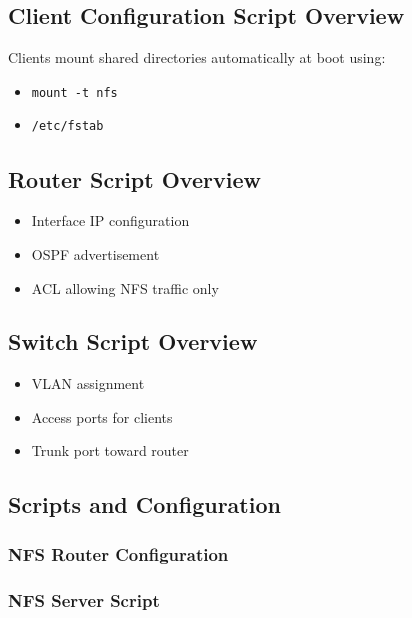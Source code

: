 \documentclass[12pt,a4paper]{article}
\begin{document}
\subsection{Client Configuration Script Overview}

Clients mount shared directories automatically at boot using:
\begin{itemize}
  \item \texttt{mount -t nfs}
  \item \texttt{/etc/fstab}
\end{itemize}

\subsection{Router Script Overview}

\begin{itemize}
  \item Interface IP configuration
  \item OSPF advertisement
  \item ACL allowing NFS traffic only
\end{itemize}

\subsection{Switch Script Overview}

\begin{itemize}
  \item VLAN assignment
  \item Access ports for clients
  \item Trunk port toward router
\end{itemize}

\subsection{Scripts and Configuration}

\subsubsection{NFS Router Configuration}



\subsubsection{NFS Server Script}
\end{document}
